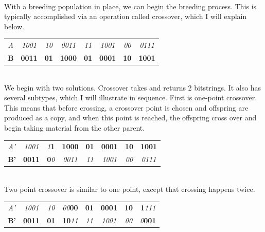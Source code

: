 \\
With a breeding population in place, we can begin the breeding process.  This is typically accomplished via an operation called crossover, which I will explain below.  \\\begin{tabular}{c|c|c|c|c|c|c|c|}
	\textit{A} & \textit{1001} & \textit{10} & \textit{0011} & \textit{11} & \textit{1001} & \textit{00} & \textit{0111}\\ 
\textbf{B} & \textbf{0011} & \textbf{01} & \textbf{1000} & \textbf{01} & \textbf{0001} & \textbf{10} & \textbf{1001}\\
	
\end{tabular}\\
We begin with two solutions.  Crossover takes and returns 2 bitstrings.    It also has several subtypes, which I will illustrate in sequence.  First is one-point crossover.  This means that before crossing, a crossover point is chosen and offspring are produced as a copy, and when this point is reached, the offspring cross over and begin taking material from the other parent.  \\

\begin{tabular}{c|c|c|c|c|c|c|c|}
	\textit{A'} & \textit{1001} & \textit{1}\textbf{1} & \textbf{1000} & \textbf{01} & \textbf{0001} & \textbf{10} & \textbf{1001}\\ 
	\textbf{B'} & \textbf{0011} & \textbf{0}\textit{0} & \textit{0011} & \textit{11} & \textit{1001} & \textit{00} & \textit{0111}\\
	
\end{tabular}\\

Two point crossover is similar to one point, except that crossing happens twice.\\

\begin{tabular}{c|c|c|c|c|c|c|c|}
	\textit{A'} & \textit{1001} & \textit{10} & \textit{00}\textbf{00}  & \textbf{01} & \textbf{0001} & \textbf{10} & \textbf{1}\textit{111}\\ 
	\textbf{B'} & \textbf{0011} & \textbf{01} & \textbf{10}\textit{11} & \textit{11} & \textit{1001} & \textit{00} & \textit{0}\textbf{001}\\
	
\end{tabular}\\


